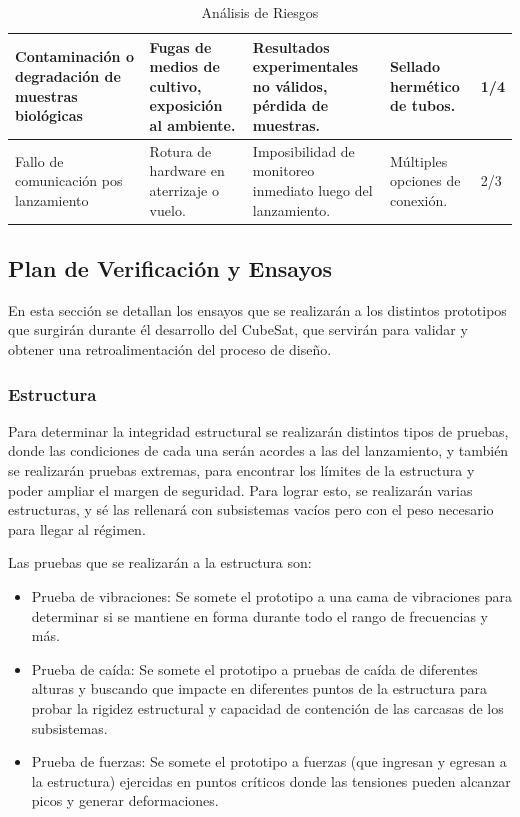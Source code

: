 \begin{table}[H]
{\begin{tabular}{ | m{3.5cm} | m{3.5cm} | m{3.5cm} | m{5cm} | m{2cm} | }
      \hline
      Contaminación o degradación de muestras biológicas & Fugas de medios de cultivo, exposición al ambiente. & Resultados experimentales no válidos, pérdida de muestras. & Sellado hermético de tubos. & \cellcolor{yellow! 50} 1/4\\
      \hline
      Fallo de comunicación pos lanzamiento & Rotura de hardware en aterrizaje o vuelo. & Imposibilidad de monitoreo inmediato luego del lanzamiento. & Múltiples opciones de conexión. & \cellcolor{yellow! 50} 2/3\\
      \hline
    \end{tabular}
    }
    \caption{Análisis de Riesgos}
    \label{tab:analisis-riesgos}
  \end{table}

  \subsection{Plan de Verificación y Ensayos}
    En esta sección se detallan los ensayos que se realizarán a los distintos prototipos que surgirán durante él
    desarrollo del CubeSat, que servirán para validar y obtener una retroalimentación del proceso de diseño.

    \subsubsection{Estructura}
      Para determinar la integridad estructural se realizarán distintos tipos de pruebas, donde las condiciones de cada
      una serán acordes a las del lanzamiento, y también se realizarán pruebas extremas, para encontrar los límites de
      la estructura y poder ampliar el margen de seguridad. Para lograr esto, se realizarán varias estructuras, y sé las
      rellenará con subsistemas vacíos pero con el peso necesario para llegar al régimen.

      Las pruebas que se realizarán a la estructura son:
      \begin{itemize}
        \item Prueba de vibraciones: Se somete el prototipo a una cama de vibraciones para determinar si se mantiene en
          forma durante todo el rango de frecuencias y más.
        \item Prueba de caída: Se somete el prototipo a pruebas de caída de diferentes alturas y buscando que impacte en
          diferentes puntos de la estructura para probar la rigidez estructural y capacidad de contención de las
          carcasas de los subsistemas.
        \item Prueba de fuerzas: Se somete el prototipo a fuerzas (que ingresan y egresan a la estructura) ejercidas en
          puntos críticos donde las tensiones pueden alcanzar picos y generar deformaciones.
      \end{itemize}

